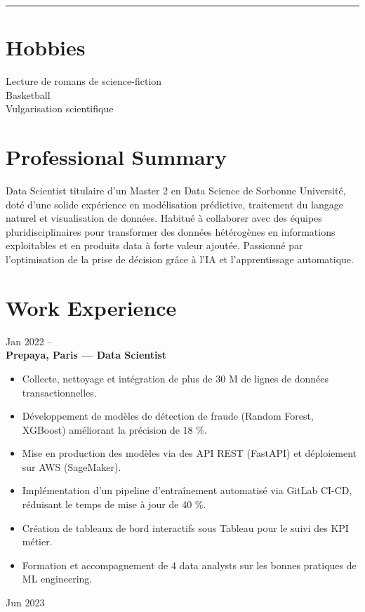 \documentclass[10pt,letterpaper]{article}
\newcommand{\cvHr}{\vspace{0.5\baselineskip}\hrule height 1pt\color{primary}\vspace{0.7\baselineskip}}
\begin{document}
\begin{paracol}{2}
\begin{leftcolumn}
\cvHr
\section*{Hobbies}
Lecture de romans de science-fiction\\
Basketball\\
Vulgarisation scientifique
\end{leftcolumn}

\begin{rightcolumn}
\section*{Professional Summary}
Data Scientist titulaire d’un Master 2 en Data Science de Sorbonne Université, doté d’une solide expérience en modélisation prédictive, traitement du langage naturel et visualisation de données. Habitué à collaborer avec des équipes pluridisciplinaires pour transformer des données hétérogènes en informations exploitables et en produits data à forte valeur ajoutée. Passionné par l’optimisation de la prise de décision grâce à l’IA et l’apprentissage automatique.

\vspace{0.5in}
\section*{Work Experience}

\begin{tcolorbox}
  \begin{minipage}[t]{0.48\linewidth}
    Jan 2022 --\\
    \textbf{Prepaya, Paris — Data Scientist}\\
    \begin{itemize}
      \item Collecte, nettoyage et intégration de plus de 30 M de lignes de données transactionnelles.
      \item Développement de modèles de détection de fraude (Random Forest, XGBoost) améliorant la précision de 18 \%.
      \item Mise en production des modèles via des API REST (FastAPI) et déploiement sur AWS (SageMaker).
      \item Implémentation d’un pipeline d’entraînement automatisé via GitLab CI-CD, réduisant le temps de mise à jour de 40 \%.
      \item Création de tableaux de bord interactifs sous Tableau pour le suivi des KPI métier.
      \item Formation et accompagnement de 4 data analysts sur les bonnes pratiques de ML engineering.
    \end{itemize}
  \end{minipage}\hfill
  \begin{minipage}[t]{0.48\linewidth}\raggedleft
    Jun 2023
  \end{minipage}
\end{tcolorbox}


\end{rightcolumn}
\end{paracol}
\end{document}
